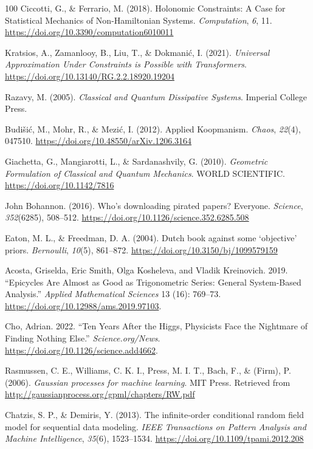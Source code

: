 \documentclass[11pt]{book}
\begin{document}
\begin{thebibliography}{100}
 Ciccotti, G., \& Ferrario, M. (2018). Holonomic Constraints: A Case for
Statistical Mechanics of Non-Hamiltonian Systems. \emph{Computation},
\emph{6}, 11. \url{https://doi.org/10.3390/computation6010011}

 Kratsios, A., Zamanlooy, B., Liu, T., \& Dokmanić, I. (2021).
\emph{Universal Approximation Under Constraints is Possible with
Transformers}. \url{https://doi.org/10.13140/RG.2.2.18920.19204}

 Razavy, M. (2005). \emph{Classical and Quantum Dissipative Systems}.
Imperial College Press.

 Budišić, M., Mohr, R., \& Mezić, I. (2012). Applied Koopmanism.
\emph{Chaos}, \emph{22}(4), 047510.
\url{https://doi.org/10.48550/arXiv.1206.3164}

 Giachetta, G., Mangiarotti, L., \& Sardanashvily, G. (2010).
\emph{Geometric Formulation of Classical and Quantum Mechanics}. WORLD
SCIENTIFIC. \url{https://doi.org/10.1142/7816}

 John Bohannon. (2016). Who's downloading pirated papers? Everyone.
\emph{Science}, \emph{352}(6285), 508--512.
\url{https://doi.org/10.1126/science.352.6285.508}

 Eaton, M. L., \& Freedman, D. A. (2004). Dutch book against some
`objective' priors. \emph{Bernoulli}, \emph{10}(5), 861--872.
\url{https://doi.org/10.3150/bj/1099579159}

 Acosta, Griselda, Eric Smith, Olga Kosheleva, and Vladik Kreinovich.
2019. {``Epicycles Are Almost as Good as Trigonometric Series: General
System-Based Analysis.''} \emph{Applied Mathematical Sciences} 13 (16):
769--73. \url{https://doi.org/10.12988/ams.2019.97103}.

 Cho, Adrian. 2022. {``Ten Years After the Higgs, Physicists Face the
Nightmare of Finding Nothing Else.''} \emph{Science.org/News}.
\url{https://doi.org/10.1126/science.add4662}.

 Rasmussen, C. E., Williams, C. K. I., Press, M. I. T., Bach, F., \&
(Firm), P. (2006). \emph{Gaussian processes for machine learning}. MIT
Press. Retrieved from
\url{http://gaussianprocess.org/gpml/chapters/RW.pdf}

 Chatzis, S. P., \& Demiris, Y. (2013). The infinite-order conditional
random field model for sequential data modeling. \emph{IEEE Transactions
on Pattern Analysis and Machine Intelligence}, \emph{35}(6), 1523--1534.
\url{https://doi.org/10.1109/tpami.2012.208}


\end{thebibliography}
\end{document}
